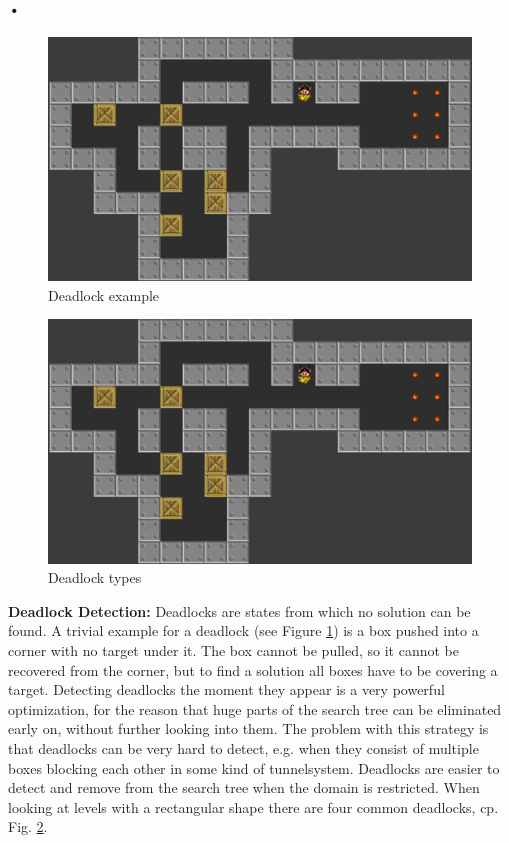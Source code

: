 \documentclass{article}
\begin{document}
\paragraph*{•}
\begin{figure}[h]
\centering
\includegraphics[scale=0.2]{flipped,deadlockexample}
\caption{Deadlock example}
\label{fig:2}
\end{figure}
\begin{figure}[h]
\centering
\includegraphics[scale=0.2]{deadlocktypes}
\caption{Deadlock types}
\label{fig:3}
\end{figure}
\textbf{Deadlock Detection:} Deadlocks are states from which no solution can be found. A trivial example for a deadlock (see Figure \ref{fig:2}) is a box pushed into a corner with no target under it. The box cannot be pulled, so it cannot be recovered from the corner, but to find a solution all boxes have to be covering a target.
Detecting deadlocks the moment they appear is a very powerful optimization, for the reason that huge parts of the search tree can be eliminated early on, without further looking into them. The problem with this strategy is that deadlocks can be very hard to detect, e.g. when they consist of multiple boxes blocking each other in some kind of tunnelsystem. Deadlocks are easier to detect and remove from the search tree when the domain is restricted. When looking at levels with a rectangular shape there are four common deadlocks, cp. Fig. \ref{fig:3}.
\end{document}
